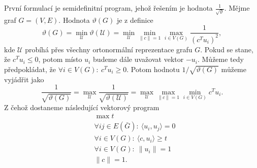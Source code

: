 První formulací je semidefinitní program, jehož řešením je hodnota $\frac{1}{\sqrt{\vartheta}}$. Mějme graf $G = (V,E)$. Hodnota $\vartheta(G)$ je z definice
$$
    \vartheta(G) = \min_\mathcal{U} \vartheta(\mathcal{U}) = \min_\mathcal{U} \min_{\|c\|=1} \max_{i \in V(G)} \frac{1}{\left( c^T u_i \right)^2},
$$
kde $\mathcal{U}$ probíhá přes všechny ortonormální reprezentace grafu $G$. Pokud se stane, že $c^T u_i \leq 0$, potom místo $u_i$ budeme dále uvažovat vektor $-u_i$. Můžeme tedy předpokládat, že $\forall i \in V(G):\ c^T u_i \geq 0$. Potom hodnotu $1/\sqrt{\vartheta(G)}$ můžeme vyjádřit jako
$$
    \frac{1}{\sqrt{\vartheta(G)}} = \max_\mathcal{U} \frac{1}{\sqrt{\vartheta(\mathcal{U})}} = \max_\mathcal{U} \max_{\|c\|=1} \min_{i \in V(G)} c^T u_i.
$$
Z čehož dostaneme následující vektorový program
\begin{equation}\tag{VP1}
    \begin{split}
        &\max t \\
        &\forall ij \in E(\bar{G}):\ \langle u_i, u_j \rangle = 0 \\
        &\forall i \in V(G):\ \langle c, u_i \rangle \geq t \\
        &\forall i \in V(G):\ \| u_i \| = 1 \\
        &\| c \| = 1.
    \end{split}
    \label{eq:VP1}
\end{equation}

